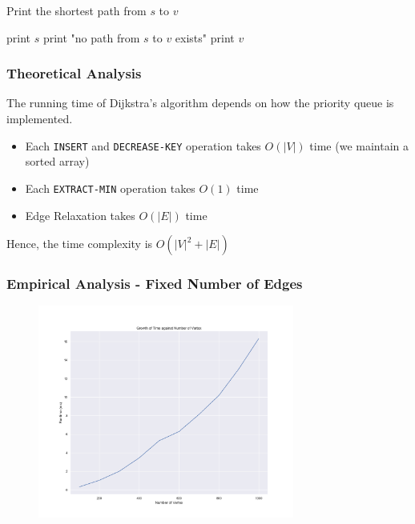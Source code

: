 \documentclass{beamer}
\begin{document}
\begin{frame}
	\begin{algorithm}[H]
		\caption{Print the shortest path from $s$ to $v$}
		\begin{algorithmic}[1]
				\State print \( s \) 
				\ElsIf{$\pi[v] = \phi$}
				\State print "no path from \( s \) to \( v \) exists"
				\Else 
				\State {}
				\State print \( v \) 
				\EndIf
			\EndFunction
		\end{algorithmic}
	\end{algorithm}
\end{frame}

\begin{frame}
	\frametitle{Theoretical Analysis}
The running time of Dijkstra’s algorithm depends on how the priority queue
is implemented. \newline 

\begin{itemize}
	\item Each \texttt{INSERT} and \texttt{DECREASE-KEY} operation takes $O( \lvert{ V }\rvert   )$ time (we maintain a sorted array)
	\item Each \texttt{EXTRACT-MIN} operation takes $O(1)$ time
	\item Edge Relaxation takes \( O( \lvert{ E }\rvert   ) \) time
\end{itemize}

Hence, the time complexity is \( O( \lvert{ V }\rvert^2 + \lvert{ E }\rvert)  \) 

\end{frame}

\begin{frame}
	\frametitle{Empirical Analysis - Fixed Number of Edges}
	\begin{figure}
		\centering
	\includegraphics[width=0.75\textwidth]{pict/Q1_fixedEdges.png}
	\end{figure}
\end{frame}
\end{document}
